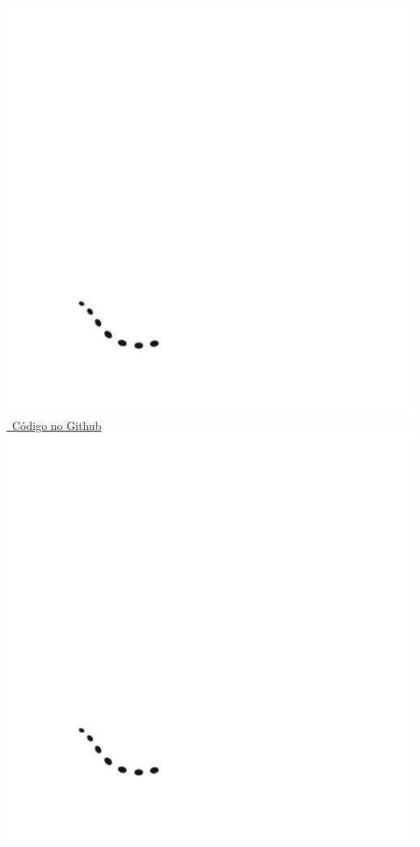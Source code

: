 \documentclass[a4paper,11pt,oneside]{book}
\theoremstyle{definition}
\theoremstyle{break}
\begin{document}
\begin{center}
\href{https://github.com/brunoruas2/Meus_Estudos/blob/main/Microeconomia/Microeconomics\%20-\%20Hal\%20Varian/models/varian_26.5_vinculacao_produtos.ipynb}{\includegraphics[scale=0.03]{_github_logo.png} \ Código no Github \includegraphics[scale=0.03]{_github_logo.png}}

\end{center}
\end{document}
